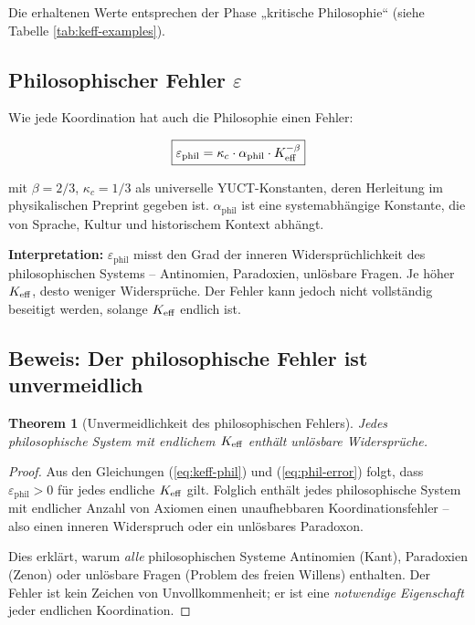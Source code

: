 \documentclass[12pt,a4paper]{article}
\newcommand{\kappac}{\kappa_c}
\newcommand{\eps}{\varepsilon}
\newcommand{\betaf}{\beta}
\newtheorem{theorem}{Theorem}[section]
\begin{document}
	Die erhaltenen Werte entsprechen der Phase „kritische Philosophie“ (siehe Tabelle \ref{tab:keff-examples}).
	
	
	\subsection{Philosophischer Fehler \texorpdfstring{\(\eps\)}{epsilon}}
	
	Wie jede Koordination hat auch die Philosophie einen Fehler:
	
	\begin{equation}
		\boxed{
			\eps_{\text{phil}} = \kappac \cdot \alpha_{\text{phil}} \cdot \Keff^{-\betaf}
		}
		\label{eq:phil-error}
	\end{equation}
	
	mit \(\betaf = 2/3\), \(\kappac = 1/3\) als universelle YUCT-Konstanten, deren Herleitung im physikalischen Preprint \cite{Yakushev2026b} gegeben ist. \(\alpha_{\text{phil}}\) ist eine systemabhängige Konstante, die von Sprache, Kultur und historischem Kontext abhängt.
	
	\textbf{Interpretation:} \(\eps_{\text{phil}}\) misst den Grad der inneren Widersprüchlichkeit des philosophischen Systems – Antinomien, Paradoxien, unlösbare Fragen. Je höher \(\Keff\), desto weniger Widersprüche. Der Fehler kann jedoch nicht vollständig beseitigt werden, solange \(\Keff\) endlich ist.
	
	\subsection{Beweis: Der philosophische Fehler ist unvermeidlich}
	
	\begin{theorem}[Unvermeidlichkeit des philosophischen Fehlers]
		Jedes philosophische System mit endlichem \(\Keff\) enthält unlösbare Widersprüche.
	\end{theorem}
	
	\begin{proof}
		Aus den Gleichungen (\ref{eq:keff-phil}) und (\ref{eq:phil-error}) folgt, dass \(\eps_{\text{phil}} > 0\) für jedes endliche \(\Keff\) gilt. Folglich enthält jedes philosophische System mit endlicher Anzahl von Axiomen einen unaufhebbaren Koordinationsfehler – also einen inneren Widerspruch oder ein unlösbares Paradoxon.
		
		Dies erklärt, warum \emph{alle} philosophischen Systeme Antinomien (Kant), Paradoxien (Zenon) oder unlösbare Fragen (Problem des freien Willens) enthalten. Der Fehler ist kein Zeichen von Unvollkommenheit; er ist eine \emph{notwendige Eigenschaft} jeder endlichen Koordination.
	\end{proof}
	
\end{document}
